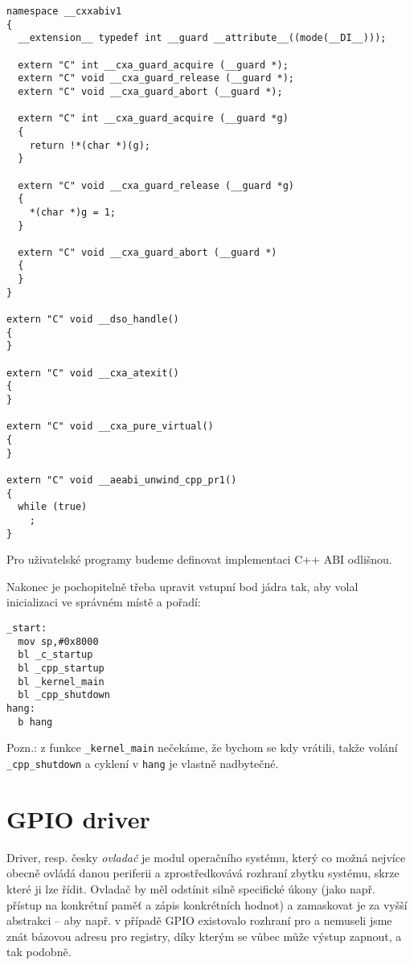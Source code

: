 \documentclass{article}
\begin{document}
\begin{lstlisting}
namespace __cxxabiv1
{
  __extension__ typedef int __guard __attribute__((mode(__DI__)));
	
  extern "C" int __cxa_guard_acquire (__guard *);
  extern "C" void __cxa_guard_release (__guard *);
  extern "C" void __cxa_guard_abort (__guard *);
	
  extern "C" int __cxa_guard_acquire (__guard *g)
  {
    return !*(char *)(g);
  }
	
  extern "C" void __cxa_guard_release (__guard *g)
  {
    *(char *)g = 1;
  }
	
  extern "C" void __cxa_guard_abort (__guard *)
  {		
  }
}

extern "C" void __dso_handle()
{
}

extern "C" void __cxa_atexit()
{
}

extern "C" void __cxa_pure_virtual()
{
}

extern "C" void __aeabi_unwind_cpp_pr1()
{
  while (true)
    ;
}

\end{lstlisting}

Pro uživatelské programy budeme definovat implementaci C++ ABI odlišnou.

Nakonec je pochopitelně třeba upravit vstupní bod jádra tak, aby volal inicializaci ve správném místě a pořadí:

\begin{lstlisting}
_start:
  mov sp,#0x8000
  bl _c_startup
  bl _cpp_startup
  bl _kernel_main
  bl _cpp_shutdown
hang:
  b hang
\end{lstlisting}

Pozn.: z funkce \texttt{\_kernel\_main} nečekáme, že bychom se kdy vrátili, takže volání \texttt{\_cpp\_shutdown} a cyklení v \texttt{hang} je vlastně nadbytečné.

\section{GPIO driver}

Driver, resp. česky \emph{ovladač} je modul operačního systému, který co možná nejvíce obecně ovládá danou periferii a zprostředkovává rozhraní zbytku systému, skrze které ji lze řídit. Ovladač by měl odstínit silně specifické úkony (jako např. přístup na konkrétní paměť a zápis konkrétních hodnot) a zamaskovat je za vyšší abstrakci -- aby např. v případě GPIO existovalo rozhraní pro  a nemuseli jsme znát bázovou adresu pro registry, díky kterým se vůbec může výstup zapnout, a tak podobně.
\end{document}
